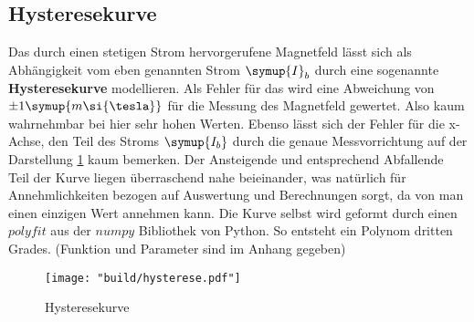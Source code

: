\subsection{Hysteresekurve}
\label{sec:Hysteresekurve}

 
 Das durch einen stetigen Strom hervorgerufene Magnetfeld lässt sich als Abhängigkeit vom eben genannten Strom $\symup{I}_b$ durch eine sogenannte \textbf{Hysteresekurve} modellieren.
 Als Fehler für das wird eine Abweichung von $\pm 1 \symup{m\si{\tesla}}$ für die Messung des Magnetfeld gewertet. Also kaum wahrnehmbar bei hier sehr hohen Werten. Ebenso lässt sich der Fehler für die x-Achse, den Teil des Stroms 
 $\symup{I_b}$ durch die genaue Messvorrichtung auf der Darstellung \ref{fig:Bfeld} kaum bemerken.
 Der Ansteigende und entsprechend Abfallende Teil der Kurve liegen überraschend nahe beieinander, was natürlich für Annehmlichkeiten bezogen auf Auswertung und Berechnungen sorgt, da von man einen einzigen Wert annehmen kann.
 Die Kurve selbst wird geformt durch einen $polyfit$ aus der $numpy$ Bibliothek von Python. So entsteht ein Polynom dritten Grades. (Funktion und Parameter sind im Anhang gegeben)

\begin{figure}[h]
    \centering
    \texttt{[image: "build/hysterese.pdf"]} %
    \caption{Hysteresekurve}
    \label{fig:Bfeld}
 \end{figure}
